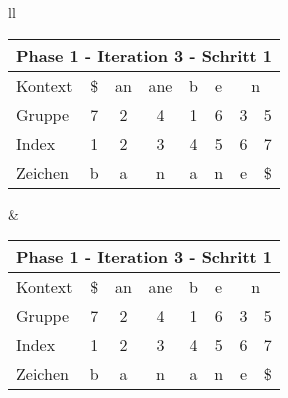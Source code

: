 \begin{table}[H]

\centering
\begin{adjustbox}{max width=\textwidth}
\begin{tabular}{ll}

\begin{tabular}{lccccccc}
\multicolumn{8}{l}{Phase 1 - Iteration 3 - Schritt 1}                                                                                                                                                          \\ \hline
\multicolumn{1}{l|}{Kontext} & \multicolumn{1}{c|}{\$} & \multicolumn{1}{c|}{an} & \multicolumn{1}{c|}{ane} & \multicolumn{1}{c|}{\cellcolor[HTML]{\green}b} & \multicolumn{1}{c|}{e} & \multicolumn{2}{c}{n} \\
\multicolumn{1}{l|}{Gruppe}  & \multicolumn{1}{c|}{7}  & \multicolumn{1}{c|}{2}  & \multicolumn{1}{c|}{4}   & \multicolumn{1}{c|}{\cellcolor[HTML]{\green}1} & \multicolumn{1}{c|}{6} & 3         & 5          \\ \hline
\multicolumn{1}{l|}{Index}   & 1                       & 2                       & 3                        & 4                                              & 5                      & 6         & 7          \\
\multicolumn{1}{l|}{Zeichen} & b                       & a                       & n                        & a                                              & n                      & e         & \$        
\end{tabular}

&

\begin{tabular}{lccccccc}
\multicolumn{8}{l}{Phase 1 - Iteration 3 - Schritt 1}                                                                                                                                                            \\ \hline
\multicolumn{1}{l|}{Kontext} & \multicolumn{1}{c|}{\$}   & \multicolumn{1}{c|}{an} & \multicolumn{1}{c|}{ane} & \multicolumn{1}{c|}{\cellcolor[HTML]{\green}b} & \multicolumn{1}{c|}{e} & \multicolumn{2}{c}{n} \\
\multicolumn{1}{l|}{Gruppe}  & \multicolumn{1}{c|}{7}    & \multicolumn{1}{c|}{2}  & \multicolumn{1}{c|}{4}   & \multicolumn{1}{c|}{\cellcolor[HTML]{\green}1} & \multicolumn{1}{c|}{6} & 3         & 5          \\ \hline
\multicolumn{1}{l|}{Index}   & \cellcolor[HTML]{\green}1 & 2                       & 3                        & 4                                              & 5                      & 6         & 7          \\
\multicolumn{1}{l|}{Zeichen} & \cellcolor[HTML]{\green}b & a                       & n                        & a                                              & n                      & e         & \$        
\end{tabular}


\end{tabular}
\end{adjustbox}
\end{table}
